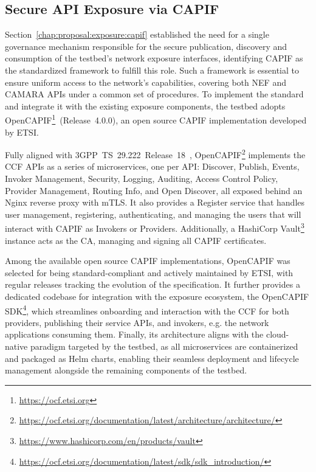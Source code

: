 \subsection{Secure \acs{API} Exposure via \acs{CAPIF}}
\label{chap:impl:exposure:capif}

Section~\ref{chap:proposal:exposure:capif} established the need for a single governance mechanism responsible for the secure publication, discovery and consumption of the testbed’s network exposure interfaces, identifying \acs{CAPIF} as the standardized framework to fulfill this role. Such a framework is essential to ensure uniform access to the network's capabilities, covering both \acs{NEF} and CAMARA \acsp{API} under a common set of procedures. To implement the standard and integrate it with the existing exposure components, the testbed adopts Open\acs{CAPIF}\footnote{\url{https://ocf.etsi.org}}~\mbox{(Release~4.0.0)}, an open source \acs{CAPIF} implementation developed by \acs{ETSI}.

Fully aligned with \mbox{3GPP~TS~29.222~Release~18}~\cite{ETSI_CAPIF_TS_129_222_V18_6_0}, Open\acs{CAPIF}\footnote{\url{https://ocf.etsi.org/documentation/latest/architecture/architecture/}} implements the \acs{CCF} \acsp{API} as a series of microservices, one per \acs{API}: Discover, Publish, Events, Invoker Management, Security, Logging, Auditing, Access Control Policy, Provider Management, Routing Info, and Open Discover, all exposed behind an Nginx reverse proxy with \acs{mTLS}. It also provides a Register service that handles user management, registering, authenticating, and managing the users that will interact with \acs{CAPIF} as Invokers or Providers. Additionally, a HashiCorp Vault\footnote{\url{https://www.hashicorp.com/en/products/vault}} instance acts as the \ac{CA}, managing and signing all \acs{CAPIF} certificates.

Among the available open source \acs{CAPIF} implementations, Open\acs{CAPIF} was selected for being standard-compliant and actively maintained by \acs{ETSI}, with regular releases tracking the evolution of the specification. It further provides a dedicated codebase for integration with the exposure ecosystem, the Open\acs{CAPIF} \acs{SDK}\footnote{\url{https://ocf.etsi.org/documentation/latest/sdk/sdk_introduction/}}, which streamlines onboarding and interaction with the \acs{CCF} for both providers, publishing their service \acsp{API}, and invokers, e.g. the network applications consuming them. Finally, its architecture aligns with the cloud-native paradigm targeted by the testbed, as all microservices are containerized and packaged as Helm charts, enabling their seamless deployment and lifecycle management alongside the remaining components of the testbed.

